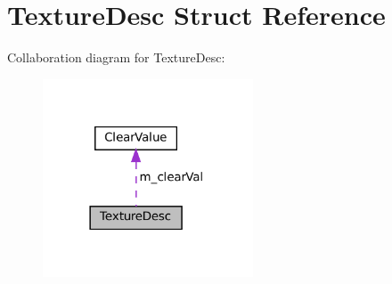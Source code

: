 \hypertarget{structTextureDesc}{}\section{Texture\+Desc Struct Reference}
\label{structTextureDesc}


Collaboration diagram for Texture\+Desc\+:
\nopagebreak
\begin{figure}[H]
\begin{center}
\leavevmode
\includegraphics[width=177pt]{structTextureDesc__coll__graph}
\end{center}
\end{figure}
